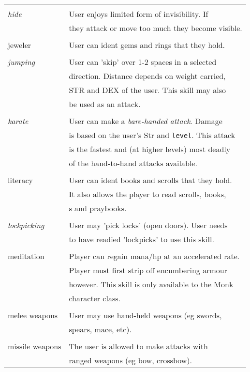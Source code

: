 \begin{longtable}{|p{4cm}|p{9cm}|}
 &  \\
{\em hide}	& User enjoys limited form of invisibility. If \\ 
		& they attack or move too much they become visible. \\ 
 & \\
jeweler		& User can ident gems and rings that they hold. \\ 
 & \\
{\em jumping}	& User can 'skip' over 1-2 spaces in a selected \\ 
		& direction. Distance depends on weight carried, \\ 
		& STR and DEX of the user. This skill may also \\ 
		& be used as an attack. \\ 
 & \\
{\em karate}	& User can make a {\em bare-handed attack}. Damage \\ 
		& is based on the user's Str and {\tt level}. This attack \\ 
		& is the fastest and (at higher levels) most deadly \\ 
		& of the hand-to-hand attacks available. \\ 
 & \\
literacy	& User can ident books and scrolls that they hold. \\ 
		& It also allows the player to read scrolls, books, \\ 
		& \wizbook s and praybooks. \\ 
 & \\
{\em lockpicking} & User may 'pick locks' (open doors). User needs \\ 
		& to have readied 'lockpicks' to use this skill. \\ 
 & \\
meditation	& Player can regain mana/hp at an accelerated rate. \\ 
		& Player must first strip off encumbering armour \\ 
		& however. This skill is only available to the Monk \\ 
		& character class. \\ 
 & \\ 
melee weapons	& User may use hand-held weapons (eg swords, \\ 
		& spears, mace, etc). \\
 & \\ 
missile weapons	& The user is allowed to make attacks with \\ 
		& ranged weapons (eg bow, crossbow). \\ 

\end{longtable}
